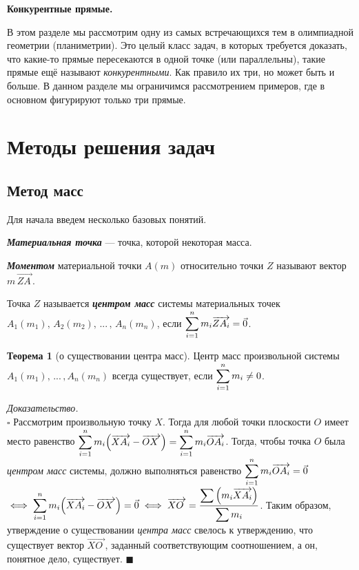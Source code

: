 \documentclass[14pt]{extarticle}
\let\Overrightarrow\overrightarrow
\let\vecarrow\overrightarrow
\theoremstyle{definition}
\theoremstyle{theorem}
\newtheorem*{theorem}{Теорема}
\renewenvironment{proof}
    {\noindent \textit{Доказательство.}\\
	\indent $\square$}
	{ $\blacksquare$\\ }
\begin{document}
\begin{center}
	\textbf{\fontsize{23}{30}\selectfont Конкурентные прямые.}
\end{center}


В этом разделе мы рассмотрим одну из самых встречающихся тем 
в олимпиадной геометрии (планиметрии). Это целый класс
задач, в которых требуется доказать, что какие-то
прямые пересекаются в одной точке (или параллельны), такие прямые ещё называют
\textit{конкурентными}. Как правило их три, но может быть и больше.
В данном разделе мы ограничимся рассмотрением примеров,
где в основном фигурируют только три прямые.\\


\section*{Методы решения задач}

\subsection{Метод масс}
Для начала введем несколько базовых понятий.

\noindent \textit{\textbf{Материальная точка}} --- точка, которой 
 некоторая масса.

\noindent \textit{\textbf{Моментом}} материальной точки $A(m)$ относительно 
точки $Z$ называют вектор $m \, \Overrightarrow{ZA_{\,}}$.

\noindent Точка $Z$ называется \textit{\textbf{центром масс}} системы материальных 
точек\\
$A_1(m_1), \, A_2(m_2), \, ... \, , \, A_n(m_n)$, 
если $\mathlarger{\sum_{i=1}^{n} m_i \Overrightarrow{ZA_i} = \vec{0}}$.


\begin{theorem}[о существовании центра масс]
	Центр масс произвольной системы $A_1(m_1), \, ... \, ,A_n(m_n)$
	всегда существует, если $\mathlarger{\sum_{i=1}^{n} m_i \ne 0}$.
\end{theorem}

{
\begin{proof}
    Рассмотрим произвольную точку $X$. Тогда для любой  точки
	плоскости $O$ имеет место равенство $\mathlarger{\sum_{i=1}^{n}
	m_i  \Big(\vecarrow{XA_i} - \vecarrow{OX_{\, \,}}\Big) = \sum_{i=1}^{n} 
	m_i  \vecarrow{OA_i}}$. Тогда, чтобы точка $O$ была 
	\textit{центром масс} системы, должно выполняться равенство
	$\mathlarger{\sum_{i=1}^{n} 
	m_i  \vecarrow{OA_i}} = \vec{0}$ $\iff \mathlarger{\sum_{i=1}^{n} m_i 
	\Big(\vecarrow{XA_i} - \vecarrow{OX_{\, \,}}\Big) = \vec{0} \iff 
    \vecarrow{XO_{\;}} = \frac{\displaystyle \sum \Big(m_i
	\vecarrow{XA_i} \Big)}{\displaystyle\sum m_i}}$. Таким образом, %
    утверждение о существовании \textit{центра масс} свелось к утверждению, что существует
	вектор $\vecarrow{XO_{\;}}$, заданный соответствующим соотношением, а он,
	понятное дело, существует.
\end{proof}
\par}
\end{document}
